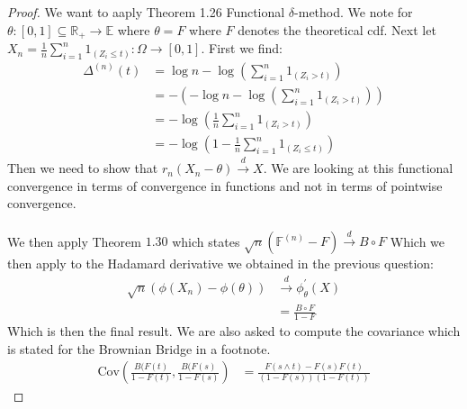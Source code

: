 \documentclass{article}
\begin{document}
\begin{proof}

We want to aaply Theorem 1.26 Functional $\delta$-method. 
We note for $\theta: [0,1] \subseteq \mathbb{R}_+ \rightarrow \mathbb{E}$ where $\theta = F$ where $F$ denotes the theoretical cdf. Next let $X_n = \frac{1}{n} \sum_{i=1}^n 1_{(Z_i \leq t)}: \Omega \rightarrow [0,1]$.
First we find:
\begin{align*}
    \Delta^{(n)}(t) &= \log n - \log \left( \sum_{i=1}^n 1_{(Z_i > t)}\right) \\
    &= - \left( - \log n - \log \left( \sum_{i=1}^n 1_{(Z_i > t)}\right) \right)  \\
    &= - \log\left( \frac{1}{n} \sum_{i=1}^n 1_{(Z_i > t)}\right) \\
    &= -\log \left( 1 - \frac{1}{n} \sum_{i=1}^n 1_{(Z_i \leq t)} \right)
\end{align*}
Then we need to show that $r_n(X_n - \theta) \overset{d}{\rightarrow} X$.
We are looking at this functional convergence in terms of convergence in functions and not in terms of pointwise convergence. 
\\ \\
We then apply Theorem $1.30$ which states $\sqrt{n}(\mathbb{F}^{(n)} - F)\overset{d}{\rightarrow} B \circ F$
Which we then apply to the Hadamard derivative we obtained in the previous question:
\begin{align*}
    \sqrt{n}(\phi(X_n) - \phi(\theta)) &\overset{d}{\rightarrow} \phi_\theta^{'}(X) \\
    &= \frac{B \circ F}{1-F}
\end{align*}
Which is then the final result. We are also asked to compute the covariance which is stated for the Brownian Bridge in a footnote.
\begin{align*}
    \text{Cov}\left( \frac{B(F(t)}{1-F(t)},  \frac{B(F(s)}{1-F(s)}\right) &= \frac{F(s\land t) - F(s)F(t)}{(1-F(s))(1-F(t))}
\end{align*}
    
\end{proof}
\end{document}
